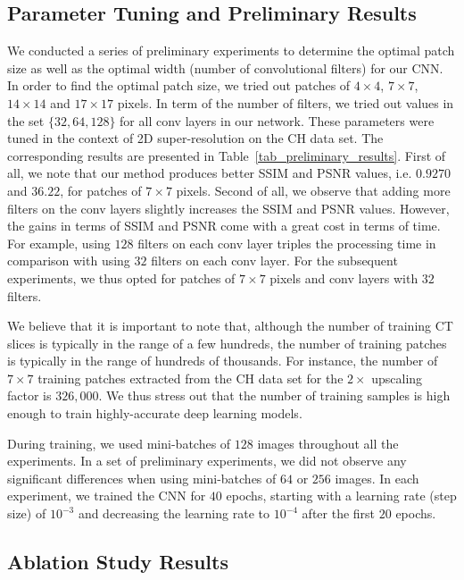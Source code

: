 \documentclass{ieeeaccess}
\begin{document}
\subsection{Parameter Tuning and Preliminary Results} 

We conducted a series of preliminary experiments to determine the optimal patch size as well as the optimal width (number of convolutional filters) for our CNN. In order to find the optimal patch size, we tried out patches of $4\times4$, $7\times7$, $14\times14$ and $17\times17$ pixels. In term of the number of filters, we tried out values in the set $\{32, 64, 128\}$ for all conv layers in our network. These parameters were tuned in the context of 2D super-resolution on the CH data set. The corresponding results are presented in Table~\ref{tab_preliminary_results}. First of all, we note that our method produces better SSIM and PSNR values, i.e. $0.9270$ and $36.22$, for patches of $7 \times 7$ pixels. Second of all, we observe that adding more filters on the conv layers slightly increases the SSIM and PSNR values. However, the gains in terms of SSIM and PSNR come with a great cost in terms of time. For example, using $128$ filters on each conv layer triples the processing time in comparison with using $32$ filters on each conv layer. For the subsequent experiments, we thus opted for patches of $7 \times 7$ pixels and conv layers with $32$ filters.

We believe that it is important to note that, although the number of training CT slices is typically in the range of a few hundreds, the number of training patches is typically in the range of hundreds of thousands. For instance, the number of $7 \times 7$ training patches extracted from the CH data set for the $2\times$ upscaling factor is $326,\!000$. We thus stress out that the number of training samples is high enough to train highly-accurate deep learning models.

During training, we used mini-batches of $128$ images throughout all the experiments. In a set of preliminary experiments, we did not observe any significant differences when using mini-batches of $64$ or $256$ images. In each experiment, we trained the CNN for $40$ epochs, starting with a learning rate (step size) of $10^{-3}$ and decreasing the learning rate to $10^{-4}$ after the first $20$ epochs.

\subsection{Ablation Study Results}
\end{document}
